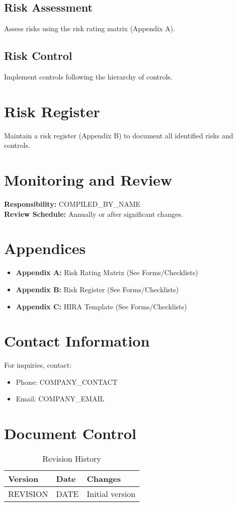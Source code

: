 \documentclass[12pt]{article}
\begin{document}
\subsection{Risk Assessment}
Assess risks using the risk rating matrix (Appendix A).

\subsection{Risk Control}
Implement controls following the hierarchy of controls.

\section{Risk Register}
Maintain a risk register (Appendix B) to document all identified risks and controls.

\section{Monitoring and Review}
\textbf{Responsibility:} {{COMPILED_BY_NAME}}\\
\textbf{Review Schedule:} Annually or after significant changes.

\section{Appendices}
\begin{itemize}
    \item \textbf{Appendix A:} Risk Rating Matrix (See Forms/Checklists)
    \item \textbf{Appendix B:} Risk Register (See Forms/Checklists)
    \item \textbf{Appendix C:} HIRA Template (See Forms/Checklists)
\end{itemize}

\section{Contact Information}
For inquiries, contact:
\begin{itemize}
    \item Phone: {{COMPANY_CONTACT}}
    \item Email: {{COMPANY_EMAIL}}
\end{itemize}

\section{Document Control}
\begin{table}[h]
    \centering
    \begin{tabular}{p{3cm}p{3cm}p{6cm}}
        \toprule
        \textbf{Version} & \textbf{Date} & \textbf{Changes} \\
        \midrule
        {{REVISION}} & {{DATE}} & Initial version \\
        \bottomrule
    \end{tabular}
    \caption{Revision History}
\end{table}
\end{document}
